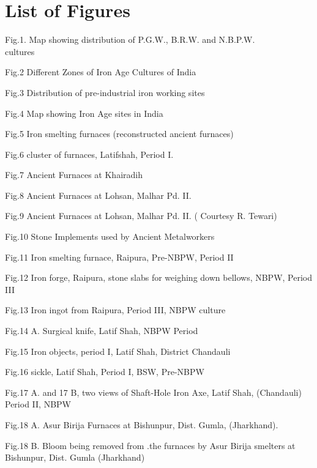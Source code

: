 \chapter*{List of Figures}\label{figures}

Fig.1. Map showing distribution of P.G.W., B.R.W. and N.B.P.W.\\ cultures

Fig.2 Different Zones of Iron Age Cultures of India 

Fig.3 Distribution of pre-industrial iron working sites

Fig.4 Map showing Iron Age sites in India

Fig.5 Iron smelting furnaces (reconstructed ancient furnaces)

Fig.6 cluster of furnaces,  Latifshah, Period I.

Fig.7 Ancient Furnaces at Khairadih  

Fig.8 Ancient Furnaces at Lohsan, Malhar Pd. II.

Fig.9 Ancient Furnaces at Lohsan, Malhar Pd. II. ( Courtesy R. Tewari)

Fig.10 Stone Implements used by Ancient Metalworkers

Fig.11 Iron smelting furnace, Raipura, Pre-NBPW, Period II

Fig.12 Iron forge, Raipura, stone slabs for weighing down bellows, NBPW, Period III 

Fig.13 Iron ingot from Raipura, Period III, NBPW culture 

Fig.14 A. Surgical knife, Latif Shah, NBPW Period

Fig.15 Iron  objects, period I, Latif Shah, District Chandauli 

Fig.16 sickle, Latif Shah, Period I, BSW, Pre-NBPW 

Fig.17 A. and 17 B, two views of Shaft-Hole Iron Axe, Latif Shah, (Chandauli) Period II, NBPW

Fig.18 A.  Asur Birija Furnaces at Bishunpur, Dist. Gumla, (Jharkhand). 

Fig.18 B. Bloom being removed from .the furnaces by Asur Birija  smelters at Bishunpur, Dist. Gumla (Jharkhand)
